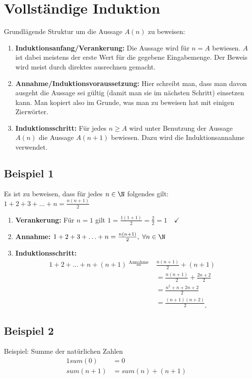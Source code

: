 \section{Vollständige Induktion}
Grundlägende Struktur um die Aussage $A(n)$ zu beweisen:
\begin{enumerate}
	\item \textbf{Induktionsanfang/Verankerung:} Die Aussage wird für $n = A$ bewiesen.
	$A$ ist dabei meistens der erste Wert für die gegebene Eingabemenge.
	Der Beweis wird meist durch direktes ausrechnen gemacht.
	\item \textbf{Annahme/Induktionsvoraussetzung:} Hier schreibt man,
	dass man davon ausgeht die Aussage sei gültig (damit man sie im nächsten Schritt)
	einsetzen kann. Man kopiert also im Grunde, was man zu beweisen hat mit einigen Zierwörter.
	\item \textbf{Induktionsschritt:} Für jedes $n \geq A$ wird unter Benutzung der Aussage $A(n)$
	die Aussage $A(n+1)$ bewiesen. Dazu wird die Induktionsannahme verwendet.
\end{enumerate}

\subsection{Beispiel 1}
Es ist zu beweisen, dass für jedes $n \in \N$ folgendes gilt: $1 + 2 + 3 + \ldots + n = \frac{n(n + 1)}{2}$
\begin{enumerate}
	\item \textbf{Verankerung:} Für $n = 1$ gilt $1 = \frac{1 (1 + 1)}{2} = \frac{2}{2} = 1 \quad \checkmark$ 
	\item \textbf{Annahme:} $1 + 2 + 3 + \ldots + n = \frac{n(n+1)}{2}, \; \forall n \in \N$
	\item \textbf{Induktionsschritt:}
	\begin{align*}
	1 + 2 + \ldots + n + (n+1) \overset{\text{Annahme}}{=} & \frac{n(n+1)}{2} + (n + 1)\\
	&= \frac{n(n+1)}{2} + \frac{2n + 2}{2} \\
	&= \frac{n^2 + n + 2n + 2}{2} \\
	&= \frac{(n + 1)(n + 2)}{2} _\square
	\end{align*}
\end{enumerate}


\subsection{Beispiel 2}
		Beispiel: Summe der natürlichen Zahlen
		\begin{alignat}{1}
		 sum(0) & = 0\\
		 sum (n+1) & = sum(n) + (n + 1) 
		\end{alignat}		
		
